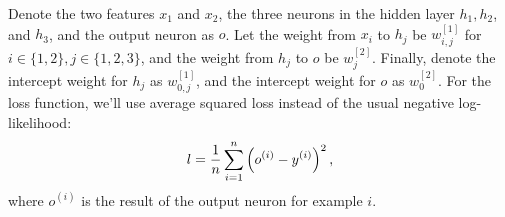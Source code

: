Denote the two features $x_1$ and $x_2$, the three neurons in the hidden layer $h_1, h_2$, and $h_3$, and the output neuron as $o$. Let the weight from $x_i$ to $h_j$ be $w_{i, j}^{[1]}$ for $i \in \{1, 2\}, j \in \{1, 2, 3\}$, and the weight from $h_j$ to $o$ be $w_{j}^{[2]}$. Finally, denote the intercept weight for $h_j$ as $w_{0, j}^{[1]}$, and the intercept weight for $o$ as $w_{0}^{[2]}$. For the loss function, we'll use average squared loss instead of the usual negative log-likelihood:
$$l = \frac{1}{{n}}\sum_{i=1}^{{n}} \left(o^{(i)} - y^{(i)}\right)^2,$$
where $o^{(i)}$ is the result of the output neuron for example $i$.

\begin{enumerate}
  

\ifnum{} {
  
} \fi

  

\ifnum{} {
  
} \fi

  
\ifnum{} {
  
} \fi


\end{enumerate}
